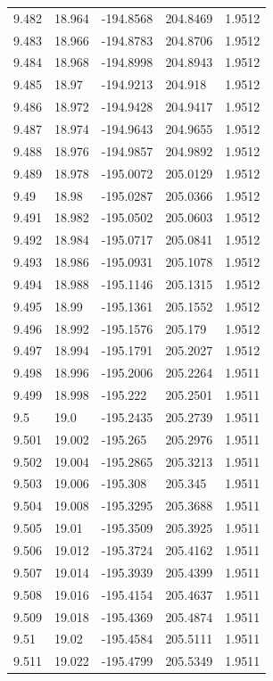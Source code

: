 \begin{tabular}{lllll}
9.482 & 18.964 & -194.8568 & 204.8469 & 1.9512 \\
9.483 & 18.966 & -194.8783 & 204.8706 & 1.9512 \\
9.484 & 18.968 & -194.8998 & 204.8943 & 1.9512 \\
9.485 & 18.97 & -194.9213 & 204.918 & 1.9512 \\
9.486 & 18.972 & -194.9428 & 204.9417 & 1.9512 \\
9.487 & 18.974 & -194.9643 & 204.9655 & 1.9512 \\
9.488 & 18.976 & -194.9857 & 204.9892 & 1.9512 \\
9.489 & 18.978 & -195.0072 & 205.0129 & 1.9512 \\
9.49 & 18.98 & -195.0287 & 205.0366 & 1.9512 \\
9.491 & 18.982 & -195.0502 & 205.0603 & 1.9512 \\
9.492 & 18.984 & -195.0717 & 205.0841 & 1.9512 \\
9.493 & 18.986 & -195.0931 & 205.1078 & 1.9512 \\
9.494 & 18.988 & -195.1146 & 205.1315 & 1.9512 \\
9.495 & 18.99 & -195.1361 & 205.1552 & 1.9512 \\
9.496 & 18.992 & -195.1576 & 205.179 & 1.9512 \\
9.497 & 18.994 & -195.1791 & 205.2027 & 1.9512 \\
9.498 & 18.996 & -195.2006 & 205.2264 & 1.9511 \\
9.499 & 18.998 & -195.222 & 205.2501 & 1.9511 \\
9.5 & 19.0 & -195.2435 & 205.2739 & 1.9511 \\
9.501 & 19.002 & -195.265 & 205.2976 & 1.9511 \\
9.502 & 19.004 & -195.2865 & 205.3213 & 1.9511 \\
9.503 & 19.006 & -195.308 & 205.345 & 1.9511 \\
9.504 & 19.008 & -195.3295 & 205.3688 & 1.9511 \\
9.505 & 19.01 & -195.3509 & 205.3925 & 1.9511 \\
9.506 & 19.012 & -195.3724 & 205.4162 & 1.9511 \\
9.507 & 19.014 & -195.3939 & 205.4399 & 1.9511 \\
9.508 & 19.016 & -195.4154 & 205.4637 & 1.9511 \\
9.509 & 19.018 & -195.4369 & 205.4874 & 1.9511 \\
9.51 & 19.02 & -195.4584 & 205.5111 & 1.9511 \\
9.511 & 19.022 & -195.4799 & 205.5349 & 1.9511 \\

\end{tabular}
